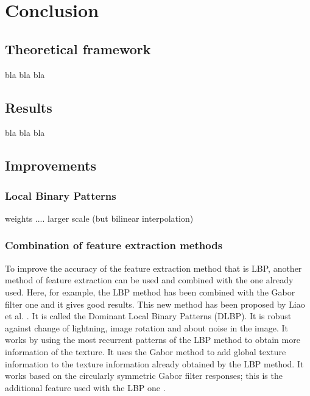 \chapter{Conclusion}
\label{chap:ccl}
  
\section{Theoretical framework}

\vspace{\baselineskip}
\noindent bla bla bla
\newline

\section{Results}

\vspace{\baselineskip}
\noindent bla bla bla
\newline

\section{Improvements}

\subsection{Local Binary Patterns}

\vspace{\baselineskip}
\noindent weights .... larger scale (but bilinear interpolation)
\newline

\subsection{Combination of feature extraction methods}

\vspace{\baselineskip}
\noindent To improve the accuracy of the feature extraction method that is LBP, another method of feature extraction can be used and combined with the one already used. Here, for example, the LBP method has been combined with the Gabor filter one and it gives good results. This new method has been proposed by Liao et al. \cite{LIA09}. It is called the Dominant Local Binary Patterns (DLBP). It is robust against change of lightning, image rotation and about noise in the image.  It works by using the most recurrent patterns of the LBP method to obtain more information of the texture. It uses the Gabor method to add global texture information to the texture information already obtained by the LBP method. It works based on the circularly symmetric Gabor filter responses; this is the additional feature used with the LBP one \cite{LIA09}.
\newline

